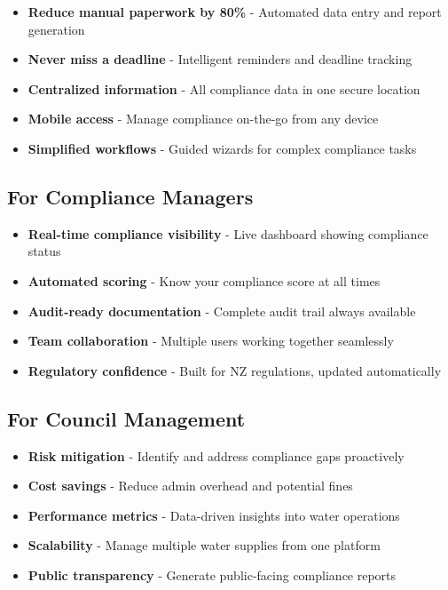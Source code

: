 \documentclass[11pt,a4paper]{article}
\begin{document}
\begin{itemize}[leftmargin=*, itemsep=0.5em]
    \item \textbf{Reduce manual paperwork by 80\%} - Automated data entry and report generation
    \item \textbf{Never miss a deadline} - Intelligent reminders and deadline tracking
    \item \textbf{Centralized information} - All compliance data in one secure location
    \item \textbf{Mobile access} - Manage compliance on-the-go from any device
    \item \textbf{Simplified workflows} - Guided wizards for complex compliance tasks
\end{itemize}

\subsection{For Compliance Managers}

\begin{itemize}[leftmargin=*, itemsep=0.5em]
    \item \textbf{Real-time compliance visibility} - Live dashboard showing compliance status
    \item \textbf{Automated scoring} - Know your compliance score at all times
    \item \textbf{Audit-ready documentation} - Complete audit trail always available
    \item \textbf{Team collaboration} - Multiple users working together seamlessly
    \item \textbf{Regulatory confidence} - Built for NZ regulations, updated automatically
\end{itemize}

\subsection{For Council Management}

\begin{itemize}[leftmargin=*, itemsep=0.5em]
    \item \textbf{Risk mitigation} - Identify and address compliance gaps proactively
    \item \textbf{Cost savings} - Reduce admin overhead and potential fines
    \item \textbf{Performance metrics} - Data-driven insights into water operations
    \item \textbf{Scalability} - Manage multiple water supplies from one platform
    \item \textbf{Public transparency} - Generate public-facing compliance reports
\end{itemize}
\end{document}
